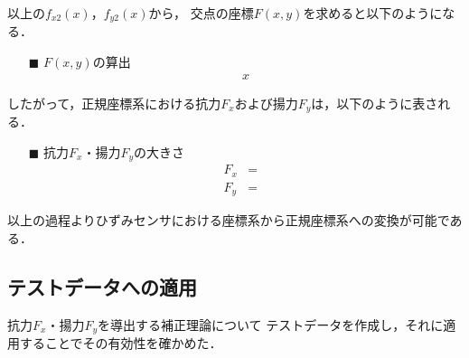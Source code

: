 \documentclass[twocolumn,a4j]{jsarticle}
\begin{document}
以上の$f_{x2}\left(x\right)$，$f_{y2}\left(x\right)$から，
交点の座標$F\left(x,y\right)$を求めると以下のようになる．

\begin{itemize}
    \item [$\blacksquare$] $F\left(x,y\right)$の算出
          \begin{eqnarray*}
              x
          \end{eqnarray*}
\end{itemize}

したがって，正規座標系における抗力$F_x$および揚力$F_y$は，以下のように表される．

\begin{itemize}
    \item [$\blacksquare$] 抗力$F_x$・揚力$F_y$の大きさ
          \begin{eqnarray*}
              F_x &=& \\
              F_y &=&
          \end{eqnarray*}
\end{itemize}

以上の過程よりひずみセンサにおける座標系から正規座標系への変換が可能である．

\newpage

\subsection{テストデータへの適用}
抗力$F_x$・揚力$F_y$を導出する補正理論について
テストデータを作成し，それに適用することでその有効性を確かめた．
\end{document}
